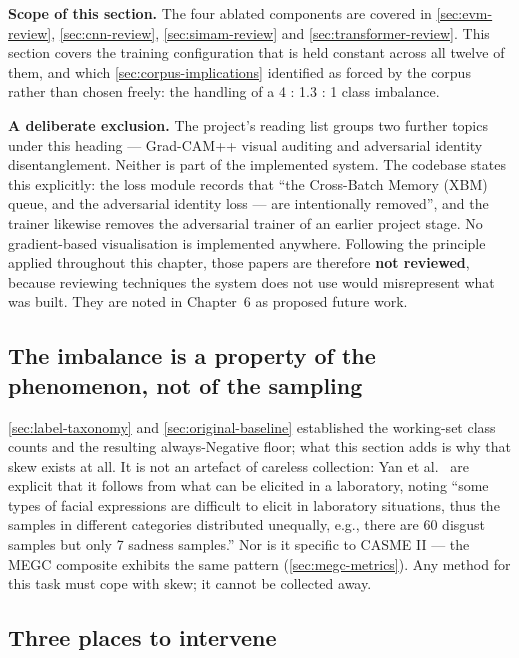 \textbf{Scope of this section.} The four ablated components are covered in \autoref{sec:evm-review}, \autoref{sec:cnn-review}, \autoref{sec:simam-review} and \autoref{sec:transformer-review}. This section covers the training configuration that is held constant across all twelve of them, and which \autoref{sec:corpus-implications} identified as forced by the corpus rather than chosen freely: the handling of a 4 : 1.3 : 1 class imbalance.

\textbf{A deliberate exclusion.} The project's reading list groups two further topics under this heading --- Grad-CAM++ visual auditing and adversarial identity disentanglement. Neither is part of the implemented system. The codebase states this explicitly: the loss module records that ``the Cross-Batch Memory (XBM) queue, and the adversarial identity loss --- are intentionally removed'', and the trainer likewise removes the adversarial trainer of an earlier project stage. No gradient-based visualisation is implemented anywhere. Following the principle applied throughout this chapter, those papers are therefore \textbf{not reviewed}, because reviewing techniques the system does not use would misrepresent what was built. They are noted in Chapter~6 as proposed future work.

\subsection{The imbalance is a property of the phenomenon, not of the sampling}
\label{sec:imbalance-property}

\autoref{sec:label-taxonomy} and \autoref{sec:original-baseline} established the working-set class counts and the resulting always-Negative floor; what this section adds is why that skew exists at all. It is not an artefact of careless collection: Yan et al.~\cite{yan2014} are explicit that it follows from what can be elicited in a laboratory, noting ``some types of facial expressions are difficult to elicit in laboratory situations, thus the samples in different categories distributed unequally, e.g., there are 60 disgust samples but only 7 sadness samples.'' Nor is it specific to CASME II --- the MEGC composite exhibits the same pattern (\autoref{sec:megc-metrics}). Any method for this task must cope with skew; it cannot be collected away.

\subsection{Three places to intervene}
\label{sec:imbalance-three-places}

